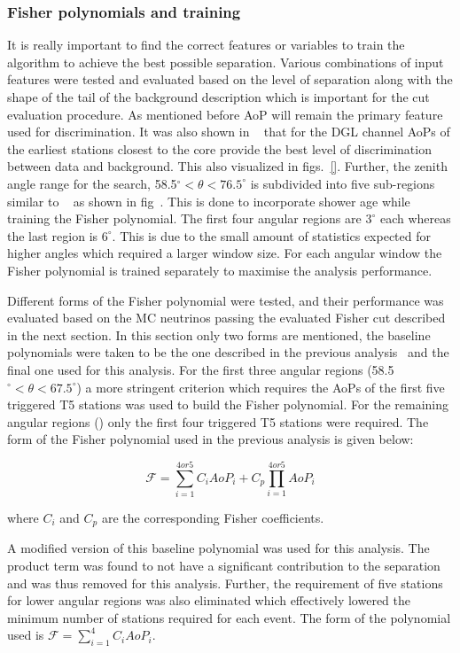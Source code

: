 \subsubsection{Fisher polynomials and training}
\label{subsubsec:nu_sel_fisher_training}
It is really important to find the correct features or variables to train the algorithm to achieve the best possible separation. Various combinations of input features were tested and evaluated based on the level of separation along with the shape of the tail of the background description which is important for the cut evaluation procedure. As mentioned before AoP will remain the primary feature used for discrimination. It was also shown in ~\cite{} that for the DGL channel AoPs of the earliest stations closest to the core provide the best level of discrimination between data and background. This also visualized in figs.~\ref{}. Further, the zenith angle range for the search, 58.5$^\circ < \theta < 76.5^\circ$ is subdivided into five sub-regions similar to ~\cite{} as shown in fig~\cite{}. This is done to incorporate shower age while training the Fisher polynomial. The first four angular regions are $3^\circ$ each whereas the last region is $6^\circ$. This is due to the small amount of statistics expected for higher angles which required a larger window size. For each angular window the Fisher polynomial is trained separately to maximise the analysis performance. 

Different forms of the Fisher polynomial were tested, and their performance was evaluated based on the MC neutrinos passing the evaluated Fisher cut described in the next section. In this section only two forms are mentioned, the baseline polynomials were taken to be the one described in the previous analysis~\cite{} and the final one used for this analysis. For the first three angular regions (58.5$^\circ < \theta < 67.5^\circ$) a more stringent criterion which requires the AoPs of the first five triggered T5 stations was used to build the Fisher polynomial. For the remaining angular regions () only the first four triggered T5 stations were required. The form of the Fisher polynomial used in the previous analysis is given below:

\begin{equation}
  \mathcal{F} = \sum_{i=1}^{4or5} C_i AoP_i + C_p \prod_{i=1}^{4or5} AoP_i
\end{equation}

where $C_i$ and $C_p$ are the corresponding Fisher coefficients. 

A modified version of this baseline polynomial was used for this analysis. The product term was found to not have a significant contribution to the separation and was thus removed for this analysis. Further, the requirement of five stations for lower angular regions was also eliminated which effectively lowered the minimum number of stations required for each event. The form of the polynomial used is $\mathcal{F} = \sum_{i=1}^{4} C_i AoP_i$. 

